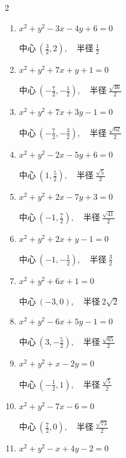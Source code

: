 \begin{multicols}{2}
\begin{enumerate}
  \item $x^{2}+y^{2}-3x-4y+6=0$

        $\displaystyle 中心\: \left(\frac{3}{2},2\right), \quad 半径 \ \frac{1}{2}$

  \item $x^{2}+y^{2}+7x+y+1=0$

        $\displaystyle 中心\: \left(-\frac{7}{2},-\frac{1}{2}\right), \quad 半径 \ \frac{\sqrt{46}}{2}$

  \item $x^{2}+y^{2}+7x+3y-1=0$

        $\displaystyle 中心\: \left(-\frac{7}{2},-\frac{3}{2}\right), \quad 半径 \ \frac{\sqrt{62}}{2}$

\columnbreak %

  \item $x^{2}+y^{2}-2x-5y+6=0$

        $\displaystyle 中心\: \left(1,\frac{5}{2}\right), \quad 半径 \ \frac{\sqrt{5}}{2}$

  \item $x^{2}+y^{2}+2x-7y+3=0$

        $\displaystyle 中心\: \left(-1,\frac{7}{2}\right), \quad 半径 \ \frac{\sqrt{41}}{2}$

  \item $x^{2}+y^{2}+2x+y-1=0$

        $\displaystyle 中心\: \left(-1,-\frac{1}{2}\right), \quad 半径 \ \frac{3}{2}$

  \item $x^{2}+y^{2}+6x+1=0$

        $\displaystyle 中心\: \left(-3,0\right), \quad 半径 \ 2\sqrt{2}$

  \item $x^{2}+y^{2}-6x+5y-1=0$

        $\displaystyle 中心\: \left(3,-\frac{5}{2}\right), \quad 半径 \ \frac{\sqrt{65}}{2}$

  \item $x^{2}+y^{2}+x-2y=0$

        $\displaystyle 中心\: \left(-\frac{1}{2},1\right), \quad 半径 \ \frac{\sqrt{5}}{2}$

  \item $x^{2}+y^{2}-7x-6=0$

        $\displaystyle 中心\: \left(\frac{7}{2},0\right), \quad 半径 \ \frac{\sqrt{73}}{2}$

  \item $x^{2}+y^{2}-x+4y-2=0$


\end{enumerate}
\end{multicols}

